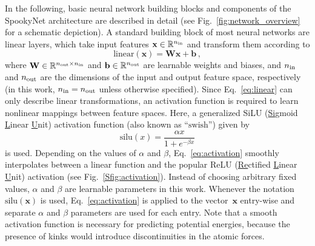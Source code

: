 \documentclass[%
superscriptaddress,
reprint,
nofootinbib,
amsmath,amssymb,amsfonts,
floatfix,
altaffilletter,
showkeys,
]{revtex4-2}
\newcommand{\nn}{SpookyNet}
\begin{document}
In the following, basic neural network building blocks and components of the \nn{} architecture are described in detail (see Fig.~\ref{fig:network_overview} for a schematic depiction). A standard building block of most neural networks are linear layers, which take input features $\mathbf{x}\in\mathbb{R}^{n_{\rm in}}$ and transform them according to
\begin{equation}
\mathrm{linear}(\mathbf{x}) = \mathbf{W}\mathbf{x} + \mathbf{b}\,,
\label{eq:linear}
\end{equation}
where $\mathbf{W}\in\mathbb{R}^{n_{\rm out}\times n_{\rm in}}$ and $\mathbf{b}\in\mathbb{R}^{n_{\rm out}}$ are learnable weights and biases, and $n_{\rm in}$ and $n_{\rm out}$ are the dimensions of the input and output feature space, respectively (in this work, $n_{\rm in}=n_{\rm out}$ unless otherwise specified).
Since Eq.~\ref{eq:linear} can only describe linear transformations, an activation function is required to learn nonlinear mappings between feature spaces.
Here, a generalized SiLU (\underline{Si}gmoid \underline{L}inear \underline{U}nit) activation function\cite{hendrycks2016gaussian,elfwing2018sigmoid} (also known as ``$\mathrm{swish}$''\cite{ramachandran2017searching}) given by
\begin{equation}
\mathrm{silu}(x) = \frac{\alpha x}{1+e^{-\beta x}}
\label{eq:activation}
\end{equation}
is used. Depending on the values of $\alpha$ and $\beta$, Eq.~\ref{eq:activation} smoothly interpolates between a linear function and the popular ReLU (\underline{Re}ctified \underline{L}inear \underline{U}nit) activation\cite{nair2010rectified} (see Fig.~\ref{Sfig:activation}).
Instead of choosing arbitrary fixed values, $\alpha$ and $\beta$ are learnable parameters in this work. Whenever the notation $\mathrm{silu}(\mathbf{x})$ is used, Eq.~\ref{eq:activation} is applied to the vector~$\mathbf{x}$ entry-wise and separate $\alpha$ and $\beta$ parameters are used for each entry. Note that a smooth activation function is necessary for predicting potential energies, because the presence of kinks would introduce discontinuities in the atomic forces.
\end{document}
